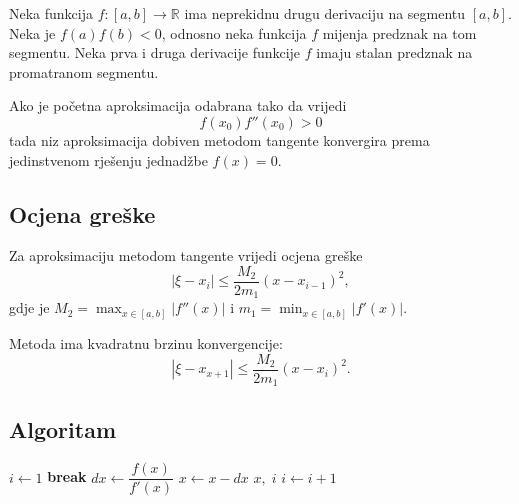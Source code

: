 Neka funkcija $f: [a,b] \to \mathbb{R}$ ima neprekidnu drugu derivaciju na
segmentu $[a,b]$. Neka je $f(a)f(b) < 0$, odnosno neka funkcija $f$ mijenja
predznak na tom segmentu.
Neka prva i druga derivacije funkcije $f$ imaju stalan predznak na promatranom
segmentu.

Ako je početna aproksimacija odabrana tako da vrijedi
$$
    f(x_0)f''(x_0) > 0
$$
tada niz aproksimacija dobiven metodom tangente konvergira prema jedinstvenom
rješenju jednadžbe $f(x) = 0$.

\subsection{Ocjena greške}

Za aproksimaciju metodom tangente vrijedi ocjena greške
$$
|\xi - x_i| \leq \dfrac{M_2}{2m_1}(x-x_{i-1})^2,
$$
gdje je $M_2 = \max_{x\in [a,b]}|f''(x)|$ i $m_1 = \min_{x\in [a,b]}|f'(x)|$.

Metoda ima kvadratnu brzinu konvergencije:
$$
|\xi - x_{x+1}| \leq \dfrac{M_2}{2m_1}(x-x_i)^2.
$$

\subsection{Algoritam}

\begin{algorithmic}
    \Else
        \State $i \gets 1$
                \State \textbf{break} 
            \EndIf
            \State $dx \gets \dfrac{f(x)}{f'(x)}$
            \State $x \gets x - dx$
                \State \Return $x,\;i$
            \Else
                \State $i \gets i + 1$
            \EndIf
        \EndWhile
    \EndIf
\EndFunction
\end{algorithmic}
